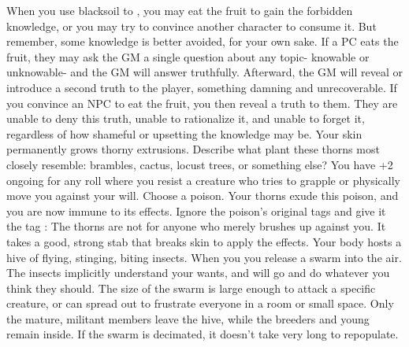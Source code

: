 \documentclass[darkmode]{dw_playbook}
\begin{document}
\pageThree
    {
        \advancedMovesCont
    }
    {
            {When you use blacksoil to , you may eat the fruit to gain the forbidden knowledge, or you may try to convince another character to consume it.  But remember, some knowledge is better avoided, for your own sake.
            \gap
            If a PC eats the fruit, they may ask the GM a single question about any topic- knowable or unknowable- and the GM will answer truthfully.  Afterward, the GM will reveal or introduce a second truth to the player, something damning and unrecoverable.
            \gap
            If you convince an NPC to eat the fruit, you then reveal a truth to them.  They are unable to deny this truth, unable to rationalize it, and unable to forget it, regardless of how shameful or upsetting the knowledge may be.}
        \gap
            {
            \gapSm
            Your skin permanently grows thorny extrusions.  Describe what plant these thorns most closely resemble: brambles, cactus, locust trees, or something else?  You have +2 ongoing for any roll where you resist a creature who tries to grapple or physically move you against your will.
            \gap
            Choose a poison.  Your thorns exude this poison, and you are now immune to its effects.  Ignore the poison's original tags and give it the tag :  The thorns are not  for anyone who merely brushes up against you.  It takes a good, strong stab that breaks skin to apply the effects.}
            {
            \gapSm
            Your body hosts a hive of flying, stinging, biting insects. When you  you release a swarm into the air.  The insects implicitly understand your wants, and will go and do whatever you think they should.  The size of the swarm is large enough to attack a specific creature, or can spread out to frustrate everyone in a room or small space.  Only the mature, militant members leave the hive, while the breeders and young remain inside.  If the swarm is decimated, it doesn’t take very long to repopulate.
}}
\end{document}
